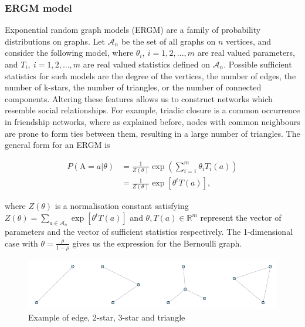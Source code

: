 \documentclass[]{article}
\begin{document}
\hypertarget{ergm-model}{%
\subsubsection{ERGM model}\label{ergm-model}}

Exponential random graph models (ERGM) are a family of probability
distributions on graphs. Let \(\mathcal{A}_n\) be the set of all graphs
on \(n\) vertices, and consider the following model, where
\(\theta_i,~i=1,2,...,m\) are real valued parameters, and
\(T_i,~i=1,2,...,m\) are real valued statistics defined on
\(\mathcal{A}_n\). Possible sufficient statistics for such models are
the degree of the vertices, the number of edges, the number of k-stars,
the number of triangles, or the number of connected components. Altering
these features allows us to construct networks which resemble social
relationships. For example, triadic closure is a common occurrence in
friendship networks, where as explained before, nodes with common
neighbours are prone to form ties between them, resulting in a large
number of triangles. The general form for an ERGM is

\[
\begin{aligned}
P(\mbox{A}=a|\theta)&=\frac{1}{Z(\theta)}\exp\left(\sum_{i=1}^m{\theta_iT_i(a)}\right) \\ &=\frac{1}{Z(\theta)}\exp\left[\theta^tT(a)\right],
\end{aligned}
\]

where \(Z(\theta)\) is a normalisation constant satisfying
\(Z(\theta)=\sum_{a \in \mathcal{A}_n}\exp\left[\theta^tT(a)\right]\)
and \(\theta,T(a) \in \mathbb{R}^m\) represent the vector of parameters
and the vector of sufficient statistics respectively. The 1-dimensional
case with \(\theta = \frac{\rho}{1-\rho}\) gives us the expression for
the Bernoulli graph.\\

\begin{figure}[H]

{\centering \includegraphics[width=0.6\linewidth,height=0.6\textheight]{triangle} 

}

\caption{\label{fig:triangle}Example of edge, 2-star, 3-star and triangle}\label{fig:unnamed-chunk-1}
\end{figure}
\end{document}
